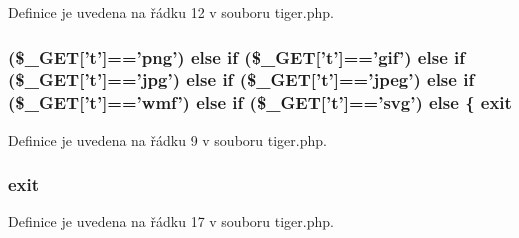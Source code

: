 Definice je uvedena na řádku 12 v souboru tiger.\-php.

\hypertarget{tiger_8php_a07a7461d4da92999bb050ce9987b65db}{
\subsubsection[{else}]{ (\$\-\_\-\-G\-E\-T\mbox{[}'t'\mbox{]}=='png') else {\bf if} (\$\-\_\-\-G\-E\-T\mbox{[}'t'\mbox{]}=='gif') else {\bf if} (\$\-\_\-\-G\-E\-T\mbox{[}'t'\mbox{]}=='jpg') else {\bf if} (\$\-\_\-\-G\-E\-T\mbox{[}'t'\mbox{]}=='jpeg') else {\bf if} (\$\-\_\-\-G\-E\-T\mbox{[}'t'\mbox{]}=='{\bf wmf}') else {\bf if} (\$\-\_\-\-G\-E\-T\mbox{[}'t'\mbox{]}=='svg') else \{ {\bf exit}}}\label{tiger_8php_a07a7461d4da92999bb050ce9987b65db}


Definice je uvedena na řádku 9 v souboru tiger.\-php.

\hypertarget{tiger_8php_a6733eb5f605d09eaede9845835d71c4e}{
\subsubsection[{exit}]{\setlength{\rightskip}{0pt plus 5cm}exit}}\label{tiger_8php_a6733eb5f605d09eaede9845835d71c4e}


Definice je uvedena na řádku 17 v souboru tiger.\-php.


